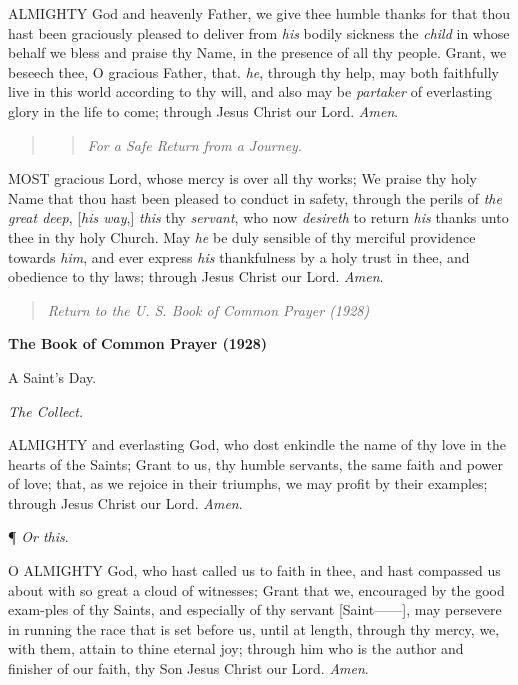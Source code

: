 ALMIGHTY
God and heavenly Father, we give thee humble thanks for that thou hast
been graciously pleased to deliver from \emph{his} bodily sickness the
\emph{child} in whose behalf we bless and praise thy Name, in the presence
of all thy people. Grant, we beseech thee, O gracious Father, that. \emph{he},
through thy help, may both faithfully live in this world according to
thy will, and also may be \emph{partaker} of everlasting glory in the
life to come; through Jesus Christ our Lord. \emph{Amen}.

\begin{quote}

\begin{quote}

\emph{For
a Safe Return from a Journey.}

\end{quote}

\end{quote}

MOST
gracious Lord, whose mercy is over all thy works; We praise thy holy Name
that thou hast been pleased to conduct in safety, through the perils of
\emph{the great deep}, [\emph{his way},] \emph{this} thy \emph{servant},
who now \emph{desireth} to return \emph{his} thanks unto thee in thy
holy Church. May \emph{he} be duly sensible of thy merciful providence
towards \emph{him}, and ever express \emph{his} thankfulness by a
holy trust in thee, and obedience to thy laws; through Jesus Christ our
Lord. \emph{Amen}.

\begin{quote}

\emph{Return to the U.
S. Book of Common Prayer (1928)}

\end{quote}


\textbf{The Book of Common Prayer (1928)}

A
Saint’s Day.

\emph{The
Collect.}

ALMIGHTY
and everlasting God, who dost enkindle the name of thy love in the hearts
of the Saints; Grant to us, thy humble servants, the same faith and power
of love; that, as we rejoice in their triumphs, we may profit by their
examples; through Jesus Christ our Lord. \emph{Amen}.

¶
\emph{Or this}.

O
ALMIGHTY God, who hast called us to faith in thee, and hast compassed
us about with so great a cloud of witnesses; Grant that we, encouraged
by the good exam-ples of thy Saints, and especially of thy servant [Saint——],
may persevere in running the race that is set before us, until at length,
through thy mercy, we, with them, attain to thine eternal joy; through
him who is the author and finisher of our faith, thy Son Jesus Christ
our Lord. \emph{Amen}.

